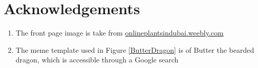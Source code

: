 \chapter{Acknowledgements}
\begin{enumerate}
    \item The front page image is take from \href{https://onlineplantsindubai.weebly.com/uploads/1/0/9/0/109064913/air-plants-terrarium-as-bearded-dragon-terrarium_1_orig.jpg}{onlineplantsindubai.weebly.com}
    \item The meme template used in Figure \ref{ButterDragon} is of Butter the bearded dragon, which is accessible through a Google search
\end{enumerate}